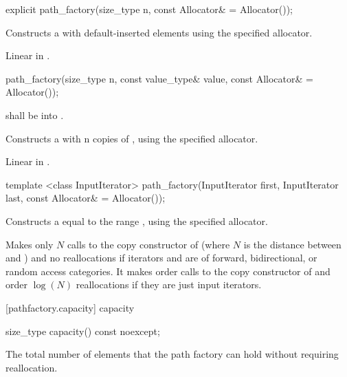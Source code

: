 \begin{itemdecl}
	explicit path_factory(size_type n, const Allocator& = Allocator());
\end{itemdecl}
\begin{itemdescr}
	\pnum
	\effects
	Constructs a  with  default-inserted elements using the specified allocator.
	
	\pnum
	\complexity
	Linear in .
\end{itemdescr}

\begin{itemdecl}
	path_factory(size_type n, const value_type& value,
	  const Allocator& = Allocator());
\end{itemdecl}
\begin{itemdescr}
	\pnum
	\requires
	 shall be  into .
	
	\pnum
	\effects
	Constructs a  with n copies of , using the specified allocator.
	
	\pnum
	\complexity
	Linear in .
\end{itemdescr}

\begin{itemdecl}
	template <class InputIterator>
	path_factory(InputIterator first, InputIterator last,
	  const Allocator& = Allocator());
\end{itemdecl}
\begin{itemdescr}
	\pnum
	\effects
	Constructs a  equal to the range , using the specified allocator.
	
	\pnum
	\complexity
	Makes only $N$ calls to the copy constructor of  (where $N$
	is the distance between
	and
	)
	and no reallocations if iterators  and  are of forward, bidirectional, or random access categories.
	It makes order
	calls to the copy constructor of
	and order
	$\log(N)$
	reallocations if they are just input iterators.
	
\end{itemdescr}

 [pathfactory.capacity] { capacity}

\begin{itemdecl}
	size_type capacity() const noexcept;
\end{itemdecl}
\begin{itemdescr}
	\pnum
	\returns
	The total number of elements that the path factory can hold without requiring reallocation.
\end{itemdescr}

